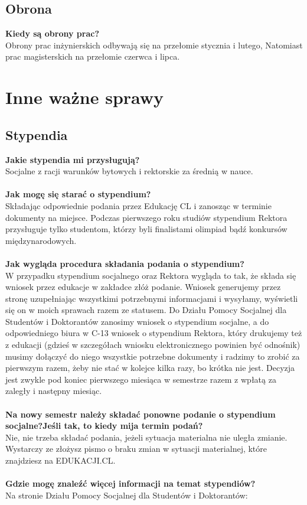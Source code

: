 \documentclass[11pt]{article}
\begin{document}
\subsection{Obrona}
\textbf{Kiedy są obrony prac?} \\
\indent Obrony prac inżynierskich odbywają się na przełomie stycznia i lutego, Natomiast prac magisterskich na przełomie czerwca i lipca.
\newpage
\section{Inne ważne sprawy}
\subsection{Stypendia}
\textbf{Jakie stypendia mi przysługują?} \\
\indent Socjalne z racji warunków bytowych i rektorskie za średnią w nauce. \\\\
\textbf{Jak mogę się starać o stypendium?} \\
\indent Składając odpowiednie podania przez Edukację CL i zanosząc w terminie dokumenty na miejsce. Podczas pierwszego roku studiów stypendium Rektora przysługuje tylko studentom, którzy byli finalistami olimpiad bądź konkursów międzynarodowych. \\\\
\textbf{Jak wygląda procedura składania podania o stypendium?} \\
\indent W przypadku stypendium socjalnego oraz Rektora wygląda to tak, że składa się wniosek przez edukacje w zakładce złóż podanie. Wniosek generujemy przez stronę uzupełniając wszystkimi potrzebnymi informacjami i wysyłamy, wyświetli się on w moich sprawach razem ze statusem. Do Działu Pomocy Socjalnej dla Studentów i Doktorantów zanosimy wniosek o stypendium socjalne, a do odpowiedniego biura w C-13 wniosek o stypendium Rektora, który drukujemy też z edukacji (gdzieś w szczegółach wniosku elektronicznego powinien być odnośnik) musimy dołączyć do niego wszystkie potrzebne dokumenty i radzimy to zrobić za pierwszym razem, żeby nie stać w kolejce kilka razy, bo krótka nie jest. Decyzja jest zwykle pod koniec pierwszego miesiąca w semestrze razem z wpłatą za zaległy i następny miesiąc. \\\\
\textbf{Na nowy semestr należy składać ponowne podanie o stypendium socjalne?Jeśli tak, to kiedy mija termin podań?} \\
\indent Nie, nie trzeba składać podania, jeżeli sytuacja materialna nie uległa zmianie. Wystarczy ze złożysz pismo o braku zmian w sytuacji materialnej, które znajdziesz na EDUKACJI.CL. \\\\
\textbf{Gdzie mogę znaleźć więcej informacji na temat stypendiów?} \\
\indent Na stronie Działu Pomocy Socjalnej dla Studentów i Doktorantów: 
{}
\end{document}
